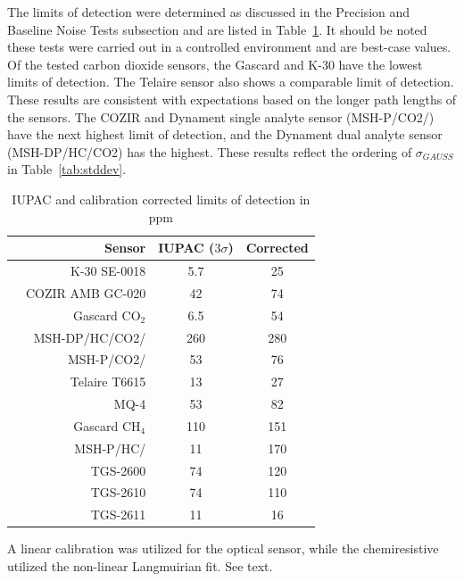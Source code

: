 \documentclass[times]{joehreview}
\begin{document}
	The limits of detection were determined as discussed in the Precision and Baseline Noise Tests subsection and are listed in Table~\ref{tab:lod}.  It should be noted these tests were carried out in a controlled environment and are best-case values.  Of the tested carbon dioxide sensors, the Gascard and K-30 have the lowest limits of detection.  The Telaire sensor also shows a comparable limit of detection.  These results are consistent with expectations based on the longer path lengths of the sensors. The COZIR and Dynament single analyte sensor (MSH-P/CO2/) have the next highest limit of detection, and the Dynament dual analyte sensor (MSH-DP/HC/CO2) has the highest.  These results reflect the ordering of $\sigma_{GAUSS}$ in Table~\ref{tab:stddev}.
	
	\begin{table}[!t]
		\begin{center}
			\begin{threeparttable}
				\setlength{\tabcolsep}{1em}
				\renewcommand{\arraystretch}{1.3}
				\caption{IUPAC and calibration corrected limits of detection in ppm}
				\label{tab:lod}
				\begin{tabular}{ c | r | c | c}
					& Sensor               & IUPAC ($3\sigma$)      & Corrected\tnote{\dag} \\ \hline
					\multirow{6}{*}{\rotatebox[origin=c]{90}{Carbon Dioxide}}
					& K-30 SE-0018         & 5.7        & 25    \\
					& COZIR AMB GC-020     & 42         & 74    \\
					& Gascard CO$_2$       & 6.5        & 54    \\
					& MSH-DP/HC/CO2/       & 260        & 280   \\
					& MSH-P/CO2/           & 53         & 76    \\
					& Telaire T6615        & 13         & 27    \\ \hline
					\multirow{7}{*}{\rotatebox[origin=c]{90}{Methane}}
					& MQ-4     & 53        & 82  \\
					& Gascard CH$_4$       & 110  & 151  \\
					& MSH-P/HC/            & 11 & 170  \\
					& TGS-2600& 74   & 120  \\
					& TGS-2610  & 74    & 110  \\
					& TGS-2611 & 11     & 16  
				\end{tabular}
				\begin{tablenotes}
					\item[\dag] A linear calibration was utilized for the optical sensor, while the chemiresistive utilized the non-linear Langmuirian fit. See text.
					\vspace{1eX}
				\end{tablenotes}
			\end{threeparttable}
		\end{center}
	\end{table}
	
\end{document}
